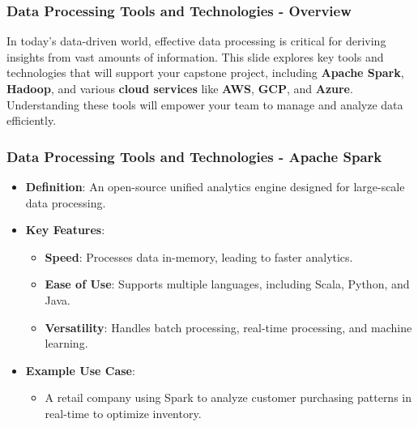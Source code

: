 \documentclass{beamer}
\begin{document}
\begin{frame}[fragile]
    \frametitle{Data Processing Tools and Technologies - Overview}
    In today’s data-driven world, effective data processing is critical for deriving insights from vast amounts of information. 
    This slide explores key tools and technologies that will support your capstone project, including 
    \textbf{Apache Spark}, \textbf{Hadoop}, and various \textbf{cloud services} like \textbf{AWS}, \textbf{GCP}, and \textbf{Azure}. 
    Understanding these tools will empower your team to manage and analyze data efficiently.
\end{frame}

\begin{frame}[fragile]
    \frametitle{Data Processing Tools and Technologies - Apache Spark}
    \begin{itemize}
        \item \textbf{Definition}: An open-source unified analytics engine designed for large-scale data processing.
        \item \textbf{Key Features}:
        \begin{itemize}
            \item \textbf{Speed}: Processes data in-memory, leading to faster analytics.
            \item \textbf{Ease of Use}: Supports multiple languages, including Scala, Python, and Java.
            \item \textbf{Versatility}: Handles batch processing, real-time processing, and machine learning.
        \end{itemize}
        \item \textbf{Example Use Case}:
        \begin{itemize}
            \item A retail company using Spark to analyze customer purchasing patterns in real-time to optimize inventory.
        \end{itemize}
    \end{itemize}
\end{frame}
\end{document}
